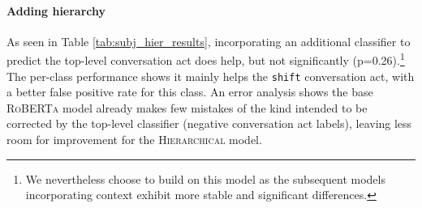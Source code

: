 \paragraph{Adding hierarchy} As seen in Table \ref{tab:subj_hier_results}, incorporating an additional classifier to predict the top-level conversation act does help, but not significantly (p=0.26).\footnote{We nevertheless choose to build on this model as the subsequent models incorporating context exhibit more stable and significant differences.} The per-class performance shows it mainly helps the \texttt{shift} conversation act, with a better false positive rate for this class. An error analysis shows the base \textsc{RoBERTa} model already makes few mistakes of the kind intended to be corrected by the top-level classifier (negative conversation act labels), leaving less room for improvement for the \textsc{Hierarchical} model.

\begin{table}[]
\centering
{}
\vspace{-.3em}
\caption{Overall and class-level macro-F1 on the test sets for models that incorporate context from the question and from the annotator. $^\ast$ indicates stat. sig., $\dagger$ not sig. better than \textsc{Hierarchical}, and $\ddagger$ not sig. better than \textsc{+Question} or \textsc{+Annotator}.}
\label{tab:subj_context_results}
\end{table}

